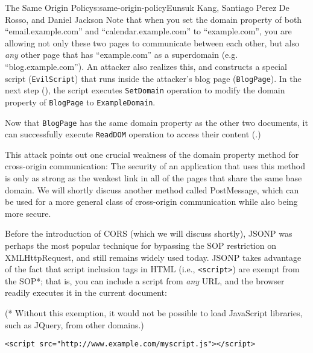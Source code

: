 \begin{aosachapter}{The Same Origin Policy}{s:same-origin-policy}{Eunsuk Kang, Santiago Perez De Rosso, and Daniel Jackson}
Note that when you set the domain property of both ``email.example.com''
and ``calendar.example.com'' to ``example.com'', you are allowing not
only these two pages to communicate between each other, but also
\emph{any} other page that has ``example.com'' as a superdomain (e.g.
``blog.example.com''). An attacker also realizes this, and constructs a
special script (\texttt{EvilScript}) that runs inside the attacker's
blog page (\texttt{BlogPage}). In the next step
(), the script
executes \texttt{SetDomain} operation to modify the domain property of
\texttt{BlogPage} to \texttt{ExampleDomain}.


Now that \texttt{BlogPage} has the same domain property as the other two
documents, it can successfully execute \texttt{ReadDOM} operation to
access their content
(.)


This attack points out one crucial weakness of the domain property
method for cross-origin communication: The security of an application
that uses this method is only as strong as the weakest link in all of
the pages that share the same base domain. We will shortly discuss
another method called PostMessage, which can be used for a more general
class of cross-origin communication while also being more secure.

\label{json-with-padding-jsonp}

Before the introduction of CORS (which we will discuss shortly), JSONP
was perhaps the most popular technique for bypassing the SOP restriction
on XMLHttpRequest, and still remains widely used today. JSONP takes
advantage of the fact that script inclusion tags in HTML (i.e.,
\texttt{\textless{}script\textgreater{}}) are exempt from the SOP*; that
is, you can include a script from \emph{any} URL, and the browser
readily executes it in the current document:

(* Without this exemption, it would not be possible to load JavaScript
libraries, such as JQuery, from other domains.)

\begin{verbatim}
<script src="http://www.example.com/myscript.js"></script>
\end{verbatim}


\end{aosachapter}
